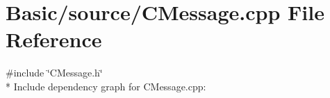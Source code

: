 \section{Basic/source/\-C\-Message.cpp File Reference}
\label{CMessage_8cpp}
{\ttfamily \#include \char`\"{}C\-Message.\-h\char`\"{}}\\*
Include dependency graph for C\-Message.\-cpp\-:
